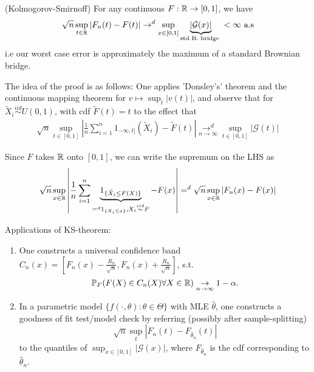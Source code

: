 \documentclass[a4paper]{article}
\begin{document}
\begin{thm} (Kolmogorov-Smirnoff)
	For any continuous $F: \mathbb{R} \to [0,1]$, we have
	\[
		\sqrt{n} \sup_{t\in \mathbb{R}} |F_n(t)-F(t)| \to ^{d} \sup_{x\in[ 0,1]} \underbrace{|\mathcal{G}(x)|}_{\text{std B. bridge }} < \infty \text{ a.s}
	\] 
	i.e our worst case error is approximately the maximum of a standard Brownian bridge.
\end{thm}

The idea of the proof is as follows: One applies 'Donsley's' theorem and the continuous mapping theorem for $v \mapsto \sup_{t} |v(t)|$, and observe that for $\tilde{X}_i \stackrel{iid}{\sim} U(0,1)$, with cdf $\tilde{F}(t) = t$ to the effect that
\begin{align*}
	\sqrt{n}  \sup_{t\in [0,1]} \left| \frac{1}{n} \sum_{i=1}^{n} 1_{-\infty,t]}(\tilde{X}_i) - \tilde{F}(t) \right| \underset{n\to \infty}{\to ^{d}} \sup_{t\in [0,1]} |\mathcal{G}(t)|
\end{align*}

Since $F$ takes $\mathbb{R}$ onto $[0,1]$, we can write the supremum on the LHS as
 \begin{align*}
	 \sqrt{n} \sup_{x \in \mathbb{R}} \left| \frac{1}{n} \sum_{i=1}^{n} \underbrace{1_{\{\tilde{X}_i \le F(X)\} }}_{=^{d} 1_{\{X_i \le x\} }, X_i \stackrel{iid}{\sim} F} - F(x) \right| =^{d} \sqrt{n} \sup_{x\in \mathbb{R}} |F_n(x) - F(x)|
\end{align*}

Applications of KS-theorem:

\begin{enumerate}
	\item One constructs a universal confidence band $C_n(x) = \left[ F_n(x) - \frac{R_n}{\sqrt{n} }, F_n(x) + \frac{R_n}{\sqrt{n} } \right] $, s.t. \[\mathbb{P}_F (F(X) \in C_n(X) \forall X  \in \mathbb{R}) \underset{n\to \infty}{\to} 1 - \alpha .\]

	\item In a parametric model $\{f\left( \cdot , \theta \right) : \theta \in \Theta \}$ with MLE $\hat{\theta}$, one constructs a goodness of fit test/model check by referring (possibly after sample-splitting)
		\[
			\sqrt{n} \sup_{t} |F_n(t) - F_{\hat{\theta}_n}(t)|
		\]
		to the quantiles of $\sup_{x \in [0,1]} |\mathcal{G}(x)|$, where $F_{\hat{\theta}_n}$ is the cdf corresponding to $\hat{\theta}_n$.
\end{enumerate}
\end{document}
